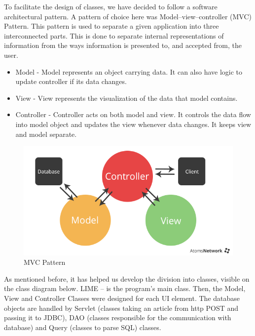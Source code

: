 \documentclass[a4paper,11pt,twoside]{report}
\theoremstyle{definition}
\begin{document}
To facilitate the design of classes, we have decided to follow a software architectural pattern. A pattern of choice here was Model–view–controller (MVC) Pattern.
This pattern is used to separate a given application into three interconnected parts. This is done to separate internal representations of information from the ways information is presented to, and accepted from, the user.
\begin{itemize}
\item Model - Model represents an object carrying data. It can also have logic to update controller if its data changes.
\item View - View represents the visualization of the data that model contains.
\item Controller - Controller acts on both model and view. It controls the data flow into model object and updates the view whenever data changes. It keeps view and model separate.
\end{itemize}
\begin{figure}[h!]

\begin{center}

\includegraphics[width=\textwidth]{mvc}

\end{center}
\caption{MVC Pattern}
\end{figure}


As mentioned before, it has helped us develop the division into classes, visible on the class diagram below.
LIME – is the program’s main class.
Then, the Model, View and Controller Classes were designed for each UI element.
The database objects are handled by Servlet (classes taking an article from http POST and passing it to JDBC), DAO (classes responsible for the communication with database) and Query (classes to parse SQL) classes.
\end{document}
